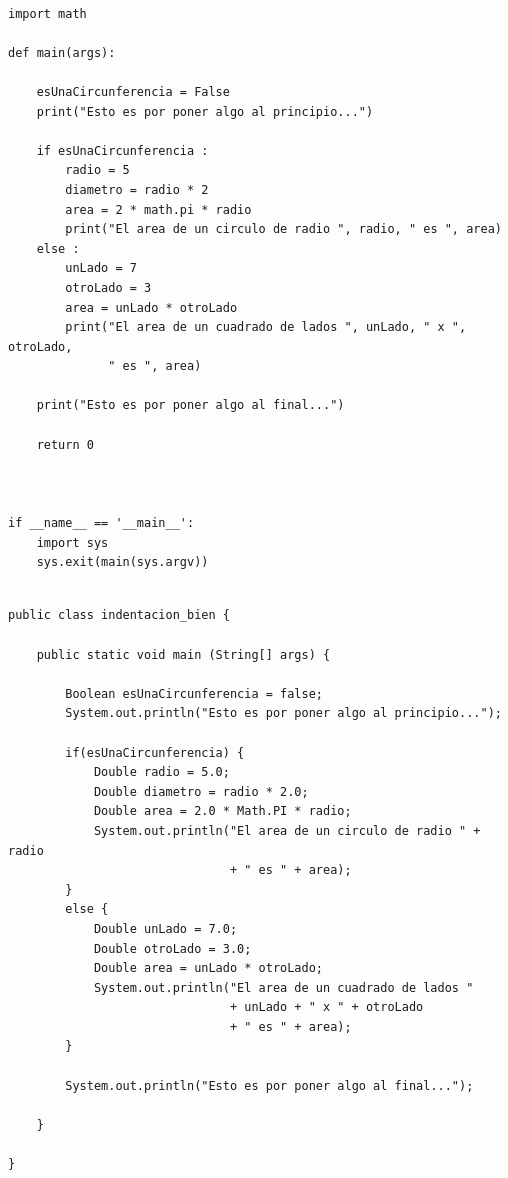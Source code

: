 \documentclass[spanish,12pt,a4paper,final,oneside]{book}
\begin{document}
\begin{lstlisting}[frame=single, caption=lenguaje Python : indentación correcta]

import math

def main(args):
    
    esUnaCircunferencia = False
    print("Esto es por poner algo al principio...")
        
    if esUnaCircunferencia :
        radio = 5
        diametro = radio * 2
        area = 2 * math.pi * radio
        print("El area de un circulo de radio ", radio, " es ", area)
    else :
        unLado = 7
        otroLado = 3
        area = unLado * otroLado
        print("El area de un cuadrado de lados ", unLado, " x ", otroLado, 
              " es ", area)
              
    print("Esto es por poner algo al final...")
        
    return 0



if __name__ == '__main__':
    import sys
    sys.exit(main(sys.argv))

\end{lstlisting}

\begin{lstlisting}[frame=single, caption=lenguaje Java : indentación correcta]

public class indentacion_bien {
	
    public static void main (String[] args) {
        
        Boolean esUnaCircunferencia = false;
        System.out.println("Esto es por poner algo al principio...");
        
        if(esUnaCircunferencia) {
            Double radio = 5.0;
            Double diametro = radio * 2.0;
            Double area = 2.0 * Math.PI * radio;
            System.out.println("El area de un circulo de radio " + radio 
                               + " es " + area);
        }
        else {
            Double unLado = 7.0;
            Double otroLado = 3.0;
            Double area = unLado * otroLado;
            System.out.println("El area de un cuadrado de lados "
                               + unLado + " x " + otroLado 
                               + " es " + area);
        }
              
        System.out.println("Esto es por poner algo al final...");
        
    }
    
}
\end{lstlisting}
\end{document}
